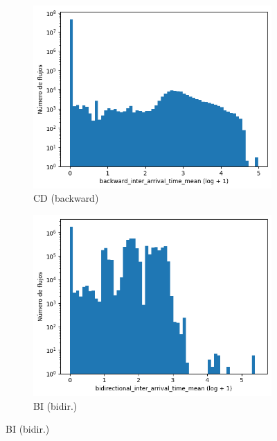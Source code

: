 \begin{figure}[H]
\begin{subfigure}[b]{0.32\textwidth}
        \includegraphics[width=\textwidth]{media/packet_pincer_cicddos/backward_inter_arrival_time_mean_log_x_log_y.png}
        \caption{CD (backward)}
    \end{subfigure}
    \hfill
    \begin{subfigure}[b]{0.32\textwidth}
        \centering
        \includegraphics[width=\linewidth]{media/packet_pincer_botiot/bidirectional_inter_arrival_time_mean_log_x_log_y.png}
        \caption{BI (bidir.)}

\end{subfigure}
\end{figure}

